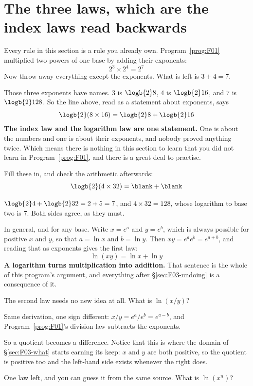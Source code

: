 \section{The three laws, which are the index laws read backwards}
\label{sec:F03-laws}

\begin{fr}
Every rule in this section is a rule you already own.
Program~\ref{prog:F01} multiplied two powers of one base by adding their
exponents:
\[ 2^{3} \times 2^{4} = 2^{7} \]
Now throw away everything except the exponents. What is left is $3 + 4 = 7$.

Those three exponents have names. $3$ is $\logb{2} 8$, $4$ is $\logb{2} 16$,
and $7$ is $\logb{2} 128$. So the line above, read as a statement about
exponents, says
\[ \logb{2}(8 \times 16) = \logb{2} 8 + \logb{2} 16 \]
\textbf{The index law and the logarithm law are one statement.} One is about
the numbers and one is about their exponents, and nobody proved anything twice.
Which means there is nothing in this section to learn that you did not learn in
Program~\ref{prog:F01}, and there is a great deal to practise.

Fill these in, and check the arithmetic afterwards:
\[ \logb{2}(4 \times 32) = \blank + \blank \]
\dotline
\nextframe
\end{fr}

\begin{fr}
\begin{ansblock}
$\logb{2} 4 + \logb{2} 32 = 2 + 5 = 7$, and $4 \times 32 = 128$, whose
logarithm to base two is $7$. Both sides agree, as they must.
\end{ansblock}

In general, and for any base. Write $x = e^{a}$ and $y = e^{b}$, which is
always possible for positive $x$ and $y$, so that $a = \ln x$ and $b = \ln y$.
Then $xy = e^{a}e^{b} = e^{a+b}$, and reading that as exponents gives the first
law:
\[ \ln(xy) = \ln x + \ln y \]
\textbf{A logarithm turns multiplication into addition.} That sentence is the
whole of this program's argument, and everything after
\S\ref{sec:F03-undoing} is a consequence of it.

The second law needs no new idea at all. What is $\ln(x/y)$?
\nextframe
\end{fr}

\begin{fr}
Same derivation, one sign different: $x/y = e^{a}/e^{b} = e^{a-b}$, and
Program~\ref{prog:F01}'s division law subtracts the exponents.

So a quotient becomes a difference. Notice that this is where the domain of
\S\ref{sec:F03-what} starts earning its keep: $x$ and $y$ are both positive, so
the quotient is positive too and the left-hand side exists whenever the right
does.

One law left, and you can guess it from the same source. What is $\ln(x^{n})$?
\nextframe
\end{fr}

